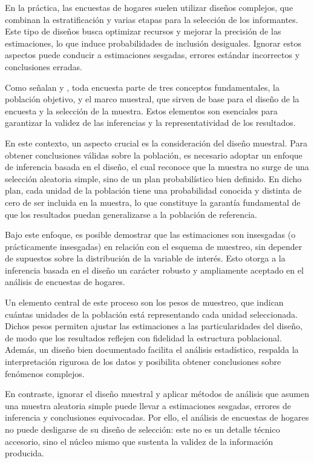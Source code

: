 \documentclass[
  spanish,
  12pt,
]{book}
\begin{document}
En la práctica, las encuestas de hogares suelen utilizar diseños complejos, que combinan la estratificación y varias etapas para la selección de los informantes. Este tipo de diseños busca optimizar recursos y mejorar la precisión de las estimaciones, lo que induce probabilidades de inclusión desiguales. Ignorar estos aspectos puede conducir a estimaciones sesgadas, errores estándar incorrectos y conclusiones erradas.

Como señalan \citet{sarndal2003model} y \citet{Gutierrez2016}, toda encuesta parte de tres conceptos fundamentales, la población objetivo, y el marco muestral, que sirven de base para el diseño de la encuesta y la selección de la muestra. Estos elementos son esenciales para garantizar la validez de las inferencias y la representatividad de los resultados.

En este contexto, un aspecto crucial es la consideración del diseño muestral. Para obtener conclusiones válidas sobre la población, es necesario adoptar un enfoque de inferencia basada en el diseño, el cual reconoce que la muestra no surge de una selección aleatoria simple, sino de un plan probabilístico bien definido. En dicho plan, cada unidad de la población tiene una probabilidad conocida y distinta de cero de ser incluida en la muestra, lo que constituye la garantía fundamental de que los resultados puedan generalizarse a la población de referencia.

Bajo este enfoque, es posible demostrar que las estimaciones son insesgadas (o prácticamente insesgadas) en relación con el esquema de muestreo, sin depender de supuestos sobre la distribución de la variable de interés. Esto otorga a la inferencia basada en el diseño un carácter robusto y ampliamente aceptado en el análisis de encuestas de hogares.

Un elemento central de este proceso son los pesos de muestreo, que indican cuántas unidades de la población está representando cada unidad seleccionada. Dichos pesos permiten ajustar las estimaciones a las particularidades del diseño, de modo que los resultados reflejen con fidelidad la estructura poblacional. Además, un diseño bien documentado facilita el análisis estadístico, respalda la interpretación rigurosa de los datos y posibilita obtener conclusiones sobre fenómenos complejos.

En contraste, ignorar el diseño muestral y aplicar métodos de análisis que asumen una muestra aleatoria simple puede llevar a estimaciones sesgadas, errores de inferencia y conclusiones equivocadas. Por ello, el análisis de encuestas de hogares no puede desligarse de su diseño de selección: este no es un detalle técnico accesorio, sino el núcleo mismo que sustenta la validez de la información producida.
\end{document}
